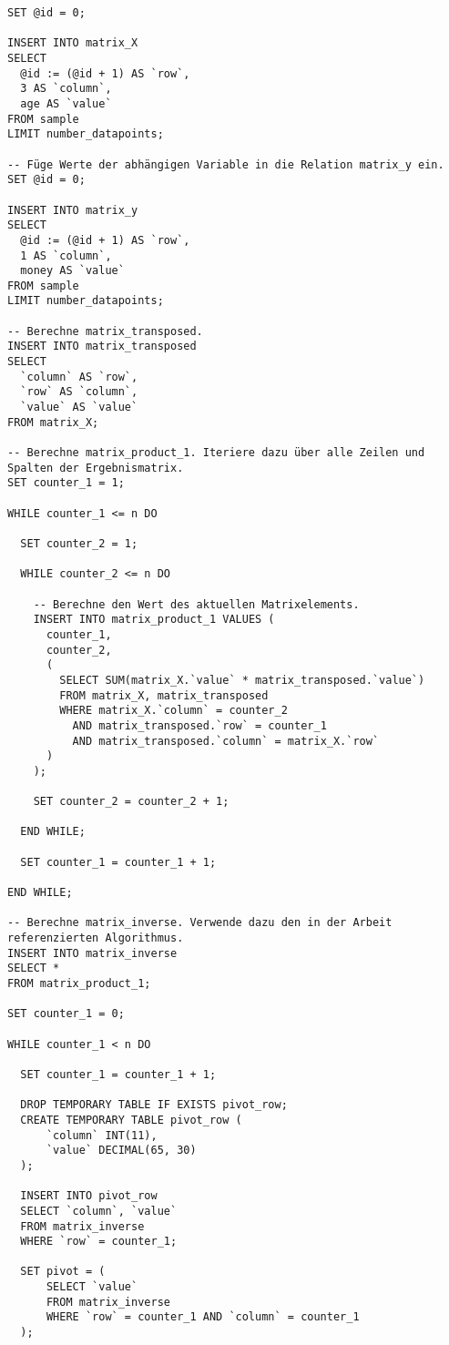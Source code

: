 \begin{verbatim}
SET @id = 0;

INSERT INTO matrix_X
SELECT
  @id := (@id + 1) AS `row`,
  3 AS `column`,
  age AS `value`
FROM sample
LIMIT number_datapoints;

-- Füge Werte der abhängigen Variable in die Relation matrix_y ein.
SET @id = 0;

INSERT INTO matrix_y
SELECT
  @id := (@id + 1) AS `row`,
  1 AS `column`,
  money AS `value`
FROM sample
LIMIT number_datapoints;

-- Berechne matrix_transposed.
INSERT INTO matrix_transposed
SELECT
  `column` AS `row`,
  `row` AS `column`,
  `value` AS `value`
FROM matrix_X;

-- Berechne matrix_product_1. Iteriere dazu über alle Zeilen und Spalten der Ergebnismatrix.
SET counter_1 = 1;

WHILE counter_1 <= n DO

  SET counter_2 = 1;

  WHILE counter_2 <= n DO

    -- Berechne den Wert des aktuellen Matrixelements.
    INSERT INTO matrix_product_1 VALUES (
      counter_1,
      counter_2,
      (
        SELECT SUM(matrix_X.`value` * matrix_transposed.`value`)
        FROM matrix_X, matrix_transposed
        WHERE matrix_X.`column` = counter_2
          AND matrix_transposed.`row` = counter_1
          AND matrix_transposed.`column` = matrix_X.`row`
      )
    );

    SET counter_2 = counter_2 + 1;

  END WHILE;

  SET counter_1 = counter_1 + 1;

END WHILE;

-- Berechne matrix_inverse. Verwende dazu den in der Arbeit referenzierten Algorithmus.
INSERT INTO matrix_inverse
SELECT *
FROM matrix_product_1;

SET counter_1 = 0;

WHILE counter_1 < n DO

  SET counter_1 = counter_1 + 1;

  DROP TEMPORARY TABLE IF EXISTS pivot_row;
  CREATE TEMPORARY TABLE pivot_row (
      `column` INT(11),
      `value` DECIMAL(65, 30)
  );

  INSERT INTO pivot_row
  SELECT `column`, `value`
  FROM matrix_inverse
  WHERE `row` = counter_1;

  SET pivot = (
      SELECT `value`
      FROM matrix_inverse
      WHERE `row` = counter_1 AND `column` = counter_1
  );


\end{verbatim}
